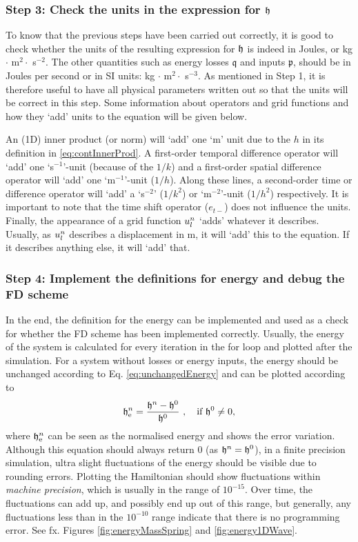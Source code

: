 {{\subsubsection{Step 3: Check the units in the expression for $\mathfrak{h}$}
To know that the previous steps have been carried out correctly, it is good to check whether the units of the resulting expression for $\mathfrak{h}$ is indeed in Joules, or kg $\cdot$ m$^2 \cdot $ s$^{-2}$. The other quantities such as energy losses $\mathfrak{q}$ and inputs $\mathfrak{p}$, should be in Joules per second or in SI units: kg $\cdot$ m$^2 \cdot $ s$^{-3}$. As mentioned in Step 1, it is therefore useful to have all physical parameters written out so that the units will be correct in this step. Some information about operators and grid functions and how they `add' units to the equation will be given below.

An (1D) inner product (or norm) will `add' one `m' unit due to the $h$ in its definition in \eqref{eq:contInnerProd}. A first-order temporal difference operator will `add' one `s$^{-1}$'-unit (because of the $1/k$) and a first-order spatial difference operator will `add' one `m$^{-1}$'-unit ($1/h$). Along these lines, a second-order time or difference operator will `add' a `s$^{-2}$' ($1/k^2$) or `m$^{-2}$'-unit ($1/h^2$) respectively. It is important to note that the time shift operator ($e_{t-}$) does not influence the units. Finally, the appearance of a grid function $u_l^n$ `adds' whatever it describes. Usually, as $u_l^n$ describes a displacement in m, it will `add' this to the equation. If it describes anything else, it will `add' that.

\subsubsection{Step 4: Implement the definitions for energy and debug the FD scheme}
In the end, the definition for the energy can be implemented and used as a check for whether the FD scheme has been implemented correctly. Usually, the energy of the system is calculated for every iteration in the for loop and plotted after the simulation.
For a system without losses or energy inputs, the energy should be unchanged according to Eq. \eqref{eq:unchangedEnergy} and can be plotted according to
% 
\begin{equation}\label{eq:normalisedEnergy}
    \mathfrak{h}_{\text{e}}^n = \frac{\mathfrak{h}^n - \mathfrak{h}^0}{\mathfrak{h}^0}\ ,\quad \text{if}\  \mathfrak{h}^0\neq 0,
\end{equation}
% 
where $\mathfrak{h}^n_\text{e}$ can be seen as the normalised energy and shows the error variation. 
Although this equation should always return $0$ (as $\mathfrak{h}^n = \mathfrak{h}^0$), in a finite precision simulation, ultra slight fluctuations of the energy should be visible due to rounding errors. Plotting the Hamiltonian should show fluctuations within \textit{machine precision}, which is usually in the range of $10^{-15}$. Over time, the fluctuations can add up, and possibly end up out of this range, but generally, any fluctuations less than in the $10^{-10}$ range indicate that there is no programming error. See fx. Figures \ref{fig:energyMassSpring} and \ref{fig:energy1DWave}.

}}
